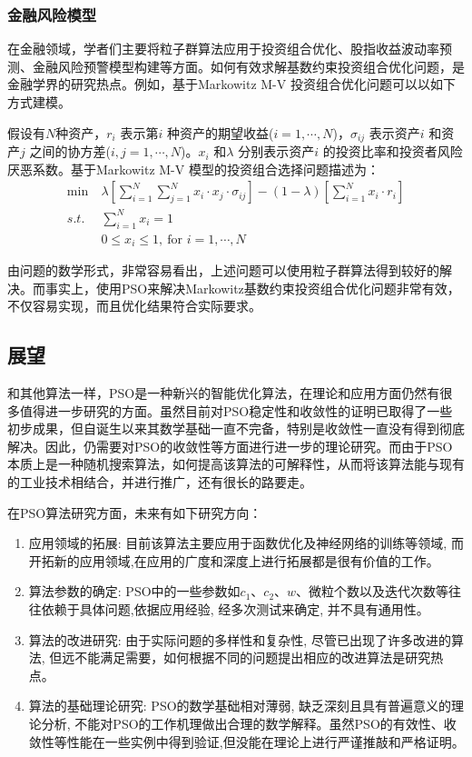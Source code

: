 \documentclass[lang=cn,12pt,a4paper,cite=authoryear]{elegantpaper}
\begin{document}
\subsubsection{金融风险模型}

在金融领域，学者们主要将粒子群算法应用于投资组合优化、股指收益波动率预测、金融风险预警模型构建等方面。如何有效求解基数约束投资组合优化问题，是金融学界的研究热点。例如，基于Markowitz M-V 投资组合优化问题可以以如下方式建模\citep{TN_cqvip668694543}。

假设有$N$种资产，$r_i$ 表示第$i$ 种资产的期望收益($i = 1,\cdots,N$)，$\sigma_{ij}$ 表示资产$i$ 和资产$j$ 之间的协方差($i,j=1,\cdots,N$)。$x_i$ 和$\lambda$ 分别表示资产$i$ 的投资比率和投资者风险厌恶系数。基于Markowitz M-V 模型的投资组合选择问题描述为：
\begin{align*}
\min \ & \lambda[\sum_{i=1}^{N}\sum_{j=1}^{N}x_i \cdot x_j\cdot \sigma_{ij}] - (1- \lambda)[\sum_{i=1}^{N}x_i\cdot r_i]\\
s.t.\ & \sum_{i=1}^{N}x_i=1\\
& 0\leq x_i \leq 1, \ \text{for }i = 1,\cdots,N
\end{align*}

由问题的数学形式，非常容易看出，上述问题可以使用粒子群算法得到较好的解决。而事实上，使用PSO来解决Markowitz基数约束投资组合优化问题非常有效，不仅容易实现，而且优化结果符合实际要求。

\subsection{展望}

和其他算法一样，PSO是一种新兴的智能优化算法，在理论和应用方面仍然有很多值得进一步研究的方面。虽然目前对PSO稳定性和收敛性的证明已取得了一些初步成果，但自诞生以来其数学基础一直不完备，特别是收敛性一直没有得到彻底解决。因此，仍需要对PSO的收敛性等方面进行进一步的理论研究。而由于PSO本质上是一种随机搜索算法，如何提高该算法的可解释性，从而将该算法能与现有的工业技术相结合，并进行推广，还有很长的路要走。

在PSO算法研究方面，未来有如下研究方向\citep{huanglei}：

\begin{enumerate}
	\item 应用领域的拓展: 目前该算法主要应用于函数优化及神经网络的训练等领域, 而开拓新的应用领域,在应用的广度和深度上进行拓展都是很有价值的工作。
	\item 算法参数的确定: PSO中的一些参数如$c_1$、$c_2$、$w$、微粒个数以及迭代次数等往往依赖于具体问题,依据应用经验, 经多次测试来确定, 并不具有通用性。
	\item 算法的改进研究: 由于实际问题的多样性和复杂性, 尽管已出现了许多改进的算法, 但远不能满足需要，如何根据不同的问题提出相应的改进算法是研究热点。
	\item 算法的基础理论研究: PSO的数学基础相对薄弱, 缺乏深刻且具有普遍意义的理论分析, 不能对PSO的工作机理做出合理的数学解释。虽然PSO的有效性、收敛性等性能在一些实例中得到验证,但没能在理论上进行严谨推敲和严格证明。
\end{enumerate}
\end{document}
